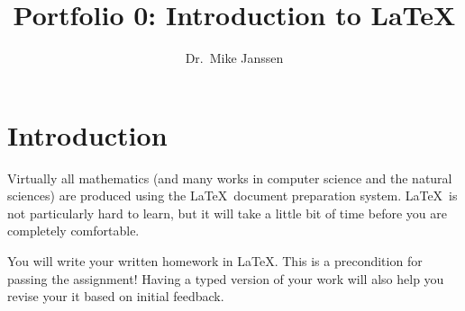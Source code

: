 \documentclass[11pt]{amsart}
\title{Portfolio 0: Introduction to \LaTeX}
\author{Dr.~Mike Janssen}
\date{}                                           %
\theoremstyle{plain}
\theoremstyle{definition}
\begin{document}
\maketitle


\section{Introduction}

Virtually all mathematics (and many works in computer science and the natural sciences) are produced using the \LaTeX\ document preparation system. \LaTeX\ is not particularly hard to learn, but it will take a little bit of time before you are completely comfortable.

You will write your written homework in \LaTeX. This is a precondition for passing the assignment! Having a typed version of your work will also help you revise your it based on initial feedback.
\end{document}
